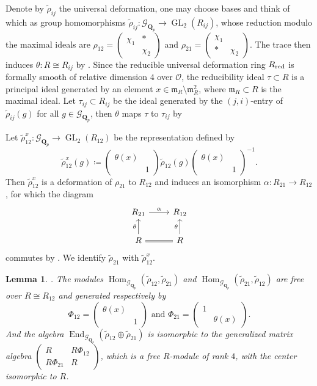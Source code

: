 \documentclass[leqno]{amsart}
\newtheorem{lem}[thm]{Lemma}
\theoremstyle{definition}
\theoremstyle{remark}
\newcommand{\smat}[1]{\left(\begin{smallmatrix} #1 \end{smallmatrix}\right)}
\newcommand{\oo}{\mathcal{O}}
\newcommand{\Qp}{\mathbf{Q}_p}
\DeclareMathOperator{\End}{End}
\DeclareMathOperator{\Hom}{Hom}
\DeclareMathOperator{\GL}{GL}
\newcommand{\fm}{\mathfrak{m}}
\newcommand{\Gp}{\mathcal{G}_{\Qp}} %
\newcommand{\red}{\textnormal{red}}
\begin{document}
Denote by $\tilde{\rho}_{ij}$ the universal deformation,
one may choose bases and think of which as group homomorphisms
$\tilde{\rho}_{ij}\colon \Gp\to \GL_2(R_{ij})$,
whose reduction modulo the maximal ideals are
$\rho_{12}=\smat{\chi_1&*\\&\chi_2}$ and
$\rho_{21}=\smat{\chi_1&\\ * &\chi_2}$.
The trace then induces 
$\theta\colon R\cong R_{ij}$
by \cite[Prop B.17]{pask}.
Since the reducible universal deformation ring
$R_{\red}$ is formally smooth of 
relative dimension $4$ over $\oo$,
the reducibility ideal  $\tau\subset R$ 
is a principal ideal generated by 
an element $x\in\fm_R\setminus \fm_R^2$,
where $\fm_R\subset R$ is the maximal ideal. 
Let $\tau_{ij}\subset R_{ij} $ be the ideal 
generated by the $(j,i)$-entry of  $ \tilde{\rho}_{ij}(g)$
for all $g\in \Gp$,
then  $\theta$ maps  
$\tau$ to  $\tau_{ij}$ by \cite[Prop B.23]{pask}

Let $\tilde{\rho}_{12}^x\colon \Gp\to \GL_2(R_{12})$ be the representation defined by
\begin{equation*}
	\tilde{\rho}_{12}^x(g)\coloneqq 
	\smat{\theta(x)&\\&1}
	\tilde{\rho}_{12}(g)
	\smat{\theta(x)&\\&1}^{-1}.
\end{equation*}
Then $\tilde{\rho}_{12}^x$
is a deformation of $\rho_{21}$ to $R_{12}$
and induces an isomorphism 
$\alpha\colon R_{21}\to R_{12}$,
for which the diagram
\begin{equation*}
	\begin{tikzcd}
		R_{21} \arrow[r,"\alpha"] &
		R_{12}\\
		R\arrow[u,"\theta"] \arrow[r,equal] &
		R\arrow[u,"\theta"]
	\end{tikzcd}
\end{equation*}
commutes by \cite[Prop B.24]{pask}.
We identify $\tilde{\rho}_{21}$ with 
$\tilde{\rho}_{12}^x$.

\begin{lem}\cite[Prop B.26]{pask}.
The modules
$\Hom_{\Gp}(\tilde{\rho}_{12}, \tilde{\rho}_{21})$ and
$\Hom_{\Gp}(\tilde{\rho}_{21}, \tilde{\rho}_{12})$
are free over $R\cong R_{12}$ and
generated respectively by
\begin{equation}\label{eq:Phi_ij}
	\Phi_{12}=\smat{\theta(x)&\\&1} \text{ and }
	\Phi_{21}=\smat{1&\\&\theta(x)}.
\end{equation}
And the algebra
$\End_{\Gp}(\tilde{\rho}_{12}\oplus \tilde{\rho}_{21})$
is isomorphic to the generalized matrix algebra
$\smat{R& R\Phi_{12}\\ R\Phi_{21}& R}$,
which is a free $R$-module of rank  $4$,
with the center isomorphic to  $R$.
\end{lem}
\end{document}
